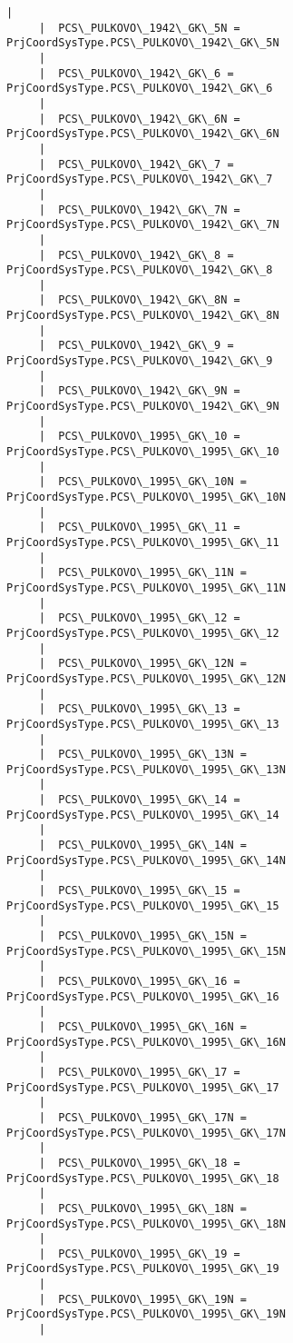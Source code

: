 \documentclass[11pt]{article}
\begin{document}
\begin{Verbatim}[commandchars=\\\{\}]
     |  
     |  PCS\_PULKOVO\_1942\_GK\_5N = PrjCoordSysType.PCS\_PULKOVO\_1942\_GK\_5N
     |  
     |  PCS\_PULKOVO\_1942\_GK\_6 = PrjCoordSysType.PCS\_PULKOVO\_1942\_GK\_6
     |  
     |  PCS\_PULKOVO\_1942\_GK\_6N = PrjCoordSysType.PCS\_PULKOVO\_1942\_GK\_6N
     |  
     |  PCS\_PULKOVO\_1942\_GK\_7 = PrjCoordSysType.PCS\_PULKOVO\_1942\_GK\_7
     |  
     |  PCS\_PULKOVO\_1942\_GK\_7N = PrjCoordSysType.PCS\_PULKOVO\_1942\_GK\_7N
     |  
     |  PCS\_PULKOVO\_1942\_GK\_8 = PrjCoordSysType.PCS\_PULKOVO\_1942\_GK\_8
     |  
     |  PCS\_PULKOVO\_1942\_GK\_8N = PrjCoordSysType.PCS\_PULKOVO\_1942\_GK\_8N
     |  
     |  PCS\_PULKOVO\_1942\_GK\_9 = PrjCoordSysType.PCS\_PULKOVO\_1942\_GK\_9
     |  
     |  PCS\_PULKOVO\_1942\_GK\_9N = PrjCoordSysType.PCS\_PULKOVO\_1942\_GK\_9N
     |  
     |  PCS\_PULKOVO\_1995\_GK\_10 = PrjCoordSysType.PCS\_PULKOVO\_1995\_GK\_10
     |  
     |  PCS\_PULKOVO\_1995\_GK\_10N = PrjCoordSysType.PCS\_PULKOVO\_1995\_GK\_10N
     |  
     |  PCS\_PULKOVO\_1995\_GK\_11 = PrjCoordSysType.PCS\_PULKOVO\_1995\_GK\_11
     |  
     |  PCS\_PULKOVO\_1995\_GK\_11N = PrjCoordSysType.PCS\_PULKOVO\_1995\_GK\_11N
     |  
     |  PCS\_PULKOVO\_1995\_GK\_12 = PrjCoordSysType.PCS\_PULKOVO\_1995\_GK\_12
     |  
     |  PCS\_PULKOVO\_1995\_GK\_12N = PrjCoordSysType.PCS\_PULKOVO\_1995\_GK\_12N
     |  
     |  PCS\_PULKOVO\_1995\_GK\_13 = PrjCoordSysType.PCS\_PULKOVO\_1995\_GK\_13
     |  
     |  PCS\_PULKOVO\_1995\_GK\_13N = PrjCoordSysType.PCS\_PULKOVO\_1995\_GK\_13N
     |  
     |  PCS\_PULKOVO\_1995\_GK\_14 = PrjCoordSysType.PCS\_PULKOVO\_1995\_GK\_14
     |  
     |  PCS\_PULKOVO\_1995\_GK\_14N = PrjCoordSysType.PCS\_PULKOVO\_1995\_GK\_14N
     |  
     |  PCS\_PULKOVO\_1995\_GK\_15 = PrjCoordSysType.PCS\_PULKOVO\_1995\_GK\_15
     |  
     |  PCS\_PULKOVO\_1995\_GK\_15N = PrjCoordSysType.PCS\_PULKOVO\_1995\_GK\_15N
     |  
     |  PCS\_PULKOVO\_1995\_GK\_16 = PrjCoordSysType.PCS\_PULKOVO\_1995\_GK\_16
     |  
     |  PCS\_PULKOVO\_1995\_GK\_16N = PrjCoordSysType.PCS\_PULKOVO\_1995\_GK\_16N
     |  
     |  PCS\_PULKOVO\_1995\_GK\_17 = PrjCoordSysType.PCS\_PULKOVO\_1995\_GK\_17
     |  
     |  PCS\_PULKOVO\_1995\_GK\_17N = PrjCoordSysType.PCS\_PULKOVO\_1995\_GK\_17N
     |  
     |  PCS\_PULKOVO\_1995\_GK\_18 = PrjCoordSysType.PCS\_PULKOVO\_1995\_GK\_18
     |  
     |  PCS\_PULKOVO\_1995\_GK\_18N = PrjCoordSysType.PCS\_PULKOVO\_1995\_GK\_18N
     |  
     |  PCS\_PULKOVO\_1995\_GK\_19 = PrjCoordSysType.PCS\_PULKOVO\_1995\_GK\_19
     |  
     |  PCS\_PULKOVO\_1995\_GK\_19N = PrjCoordSysType.PCS\_PULKOVO\_1995\_GK\_19N
     |  

\end{Verbatim}
\end{document}
